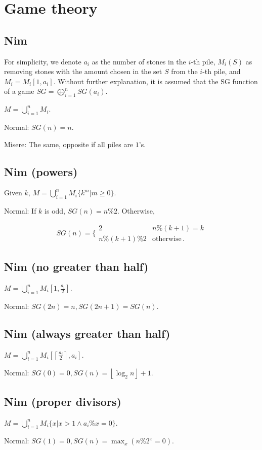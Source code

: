\section{Game theory}
\subsection{Nim}
For simplicity, we denote $a_i$ as the number of stones in the $i$-th pile, $M_i(S)$ as removing stones with the amount chosen in the set $S$ from the $i$-th pile, and $M_i=M_i[1,a_i]$. Without further explanation, it is assumed that the SG function of a game $SG=\bigoplus_{i=1}^nSG(a_i)$.

$M=\bigcup_{i=1}^nM_i$.

Normal: $SG(n)=n$.

Misere: The same, opposite if all piles are $1$'s.

\subsection{Nim (powers)}
Given $k$, $M=\bigcup_{i=1}^nM_i\{k^m|m\ge 0\}$.

Normal: If $k$ is odd, $SG(n)=n\%2$. Otherwise,

$$SG(n)=\biggl\{\begin{array}{lr}
2 & n\%(k+1)=k \\
n\%(k+1)\%2 & \mathrm{otherwise}\,.\end{array}$$

\subsection{Nim (no greater than half)}
$M=\bigcup_{i=1}^nM_i[1,\frac{a_i}{2}]$.

Normal: $SG(2n)=n,SG(2n+1)=SG(n)$.

\subsection{Nim (always greater than half)}
$M=\bigcup_{i=1}^nM_i[\left\lceil \frac{a_i}{2}\right\rceil, a_i]$.

Normal: $SG(0)=0,SG(n)=\left\lfloor \log_2 n\right\rfloor +1$.

\subsection{Nim (proper divisors)}
$M=\bigcup_{i=1}^nM_i\{x|x>1\wedge a_i\% x=0\}$.

Normal: $SG(1)=0,SG(n)=\max_x(n\%2^x=0)$.

